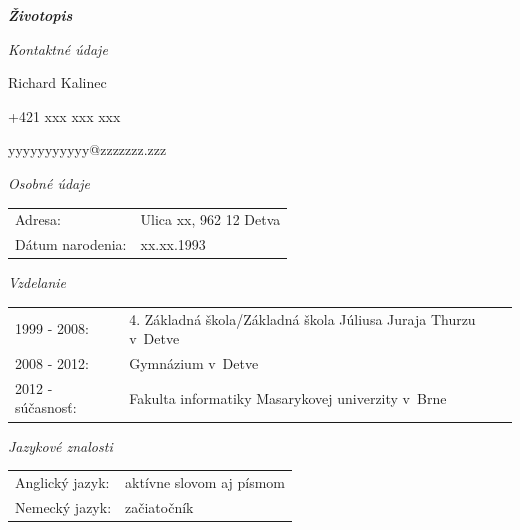 \documentclass{article}
\begin{document}
\begin{center}
\Huge
\textbf{\textit{Životopis}}
\end{center}
\bigskip

\begin{flushleft}
\Large
\textit{\textsf{Kontaktné údaje}}
\normalsize

\smallskip

Richard Kalinec

+421 xxx xxx xxx

yyyyyyyyyyy@zzzzzzz.zzz
\end{flushleft}

\bigskip

\begin{flushleft}
\Large
\textit{\textsf{Osobné údaje}}
\normalsize
\end{flushleft}

\smallskip

\begin{adjustwidth}{-6pt}{}
\begin{tabular}{l l}
	Adresa: & Ulica xx, 962 12 Detva \\
	Dátum narodenia: & xx.xx.1993
\end{tabular}
\end{adjustwidth}

\bigskip

\begin{flushleft}
\Large
\textit{\textsf{Vzdelanie}}
\normalsize
\end{flushleft}

\smallskip

\begin{adjustwidth}{-6pt}{}
\begin{tabular}{l l}
	1999 - 2008: & 4. Základná škola/Základná škola Júliusa Juraja Thurzu v~Detve\\
	2008 - 2012: & Gymnázium v~Detve\\
	2012 - súčasnosť: & Fakulta informatiky Masarykovej univerzity v~Brne\\
\end{tabular}
\end{adjustwidth}

\bigskip

\begin{flushleft}
\Large
\textit{\textsf{Jazykové znalosti}}
\normalsize
\end{flushleft}

\smallskip

\begin{adjustwidth}{-6pt}{}
\begin{tabular}{l l}
Anglický jazyk: & aktívne slovom aj písmom \\
Nemecký jazyk: & začiatočník
\end{tabular}
\end{adjustwidth}
\end{document}
